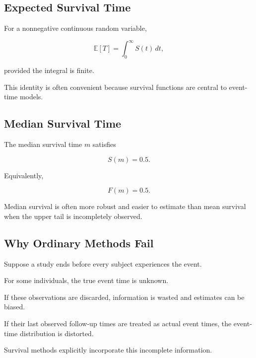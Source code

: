 \subsection{Expected Survival Time}
\label{subsec:expected-survival-time}

For a nonnegative continuous random variable,

\[
\boxed{
\mathbb{E}[T]
=
\int_0^\infty
S(t)\,dt,
}
\]

provided the integral is finite.

This identity is often convenient because survival functions are central
to event-time models.

\subsection{Median Survival Time}
\label{subsec:median-survival-time}

The median survival time \(m\) satisfies

\[
\boxed{
S(m)=0.5.
}
\]

Equivalently,

\[
\boxed{
F(m)=0.5.
}
\]

Median survival is often more robust and easier to estimate than mean
survival when the upper tail is incompletely observed.

\subsection{Why Ordinary Methods Fail}
\label{subsec:why-ordinary-survival-methods-fail}

Suppose a study ends before every subject experiences the event.

For some individuals, the true event time is unknown.

If these observations are discarded, information is wasted and estimates
can be biased.

If their last observed follow-up times are treated as actual event times,
the event-time distribution is distorted.

Survival methods explicitly incorporate this incomplete information.

